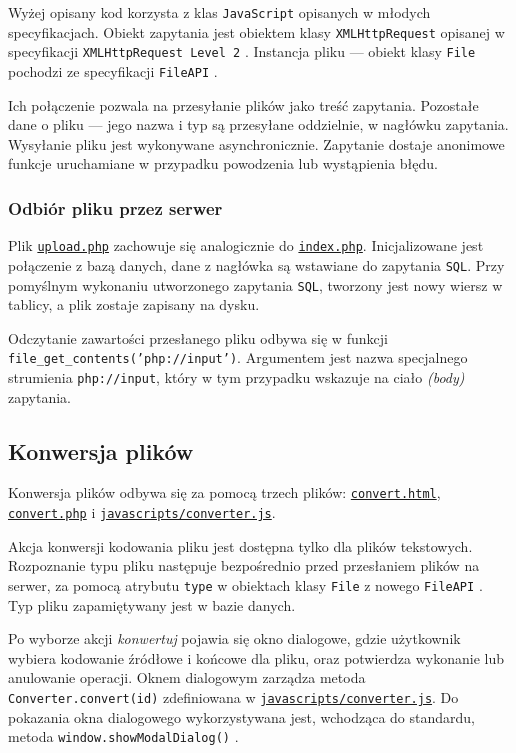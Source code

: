 \documentclass[10pt,a4paper]{article}
\newcommand{\f}[1]{\texttt{#1}}
\newcommand{\rev}{35c18ee3786b53133ca699f3f44c15e18e2d7a25}
\newcommand{\revhref}[1] {\href{https://github.com/student-tomasz/pi-cwiczenie-4/blob/\rev/#1}{\f{#1}}}
\begin{document}
Wyżej opisany kod korzysta z klas \f{JavaScript} opisanych w młodych
specyfikacjach. Obiekt zapytania jest obiektem klasy \f{XMLHttpRequest} opisanej
w specyfikacji \f{XMLHttpRequest Level 2} \cite{xhr}. Instancja pliku --- obiekt
klasy \f{File} pochodzi ze specyfikacji \f{FileAPI} \cite{fileapi}.

Ich połączenie pozwala na przesyłanie plików jako treść zapytania. Pozostałe
dane o pliku --- jego nazwa i typ są przesyłane oddzielnie, w nagłówku
zapytania. Wysyłanie pliku jest wykonywane asynchronicznie. Zapytanie dostaje
anonimowe funkcje uruchamiane w przypadku powodzenia lub wystąpienia błędu.

\subsubsection{Odbiór pliku przez serwer}

Plik \revhref{upload.php} zachowuje się analogicznie do \revhref{index.php}.
Inicjalizowane jest połączenie z bazą danych, dane z nagłówka są wstawiane do
zapytania \f{SQL}. Przy pomyślnym wykonaniu utworzonego zapytania \f{SQL},
tworzony jest nowy wiersz w tablicy, a plik zostaje zapisany na dysku.

Odczytanie zawartości przesłanego pliku odbywa się w funkcji
\f{file\_get\_contents('php://input')}. Argumentem jest nazwa specjalnego
strumienia \f{php://input}, który w tym przypadku wskazuje na ciało
\emph{(body)} zapytania.


\subsection{Konwersja plików}

Konwersja plików odbywa się za pomocą trzech plików: \revhref{convert.html},
\revhref{convert.php} i \revhref{javascripts/converter.js}.

Akcja konwersji kodowania pliku jest dostępna tylko dla plików tekstowych.
Rozpoznanie typu pliku następuje bezpośrednio przed przesłaniem plików na
serwer, za pomocą atrybutu \f{type} w obiektach klasy \f{File} z nowego
\f{FileAPI} \cite{fileapi}. Typ pliku zapamiętywany jest w bazie danych.

Po wyborze akcji \emph{konwertuj} pojawia się okno dialogowe, gdzie użytkownik
wybiera kodowanie źródłowe i końcowe dla pliku, oraz potwierdza wykonanie lub
anulowanie operacji. Oknem dialogowym zarządza metoda \f{Converter.convert(id)}
zdefiniowana w \revhref{javascripts/converter.js}. Do pokazania okna dialogowego
wykorzystywana jest, wchodząca do standardu, metoda \f{window.showModalDialog()}
\cite{modal}.
\end{document}
